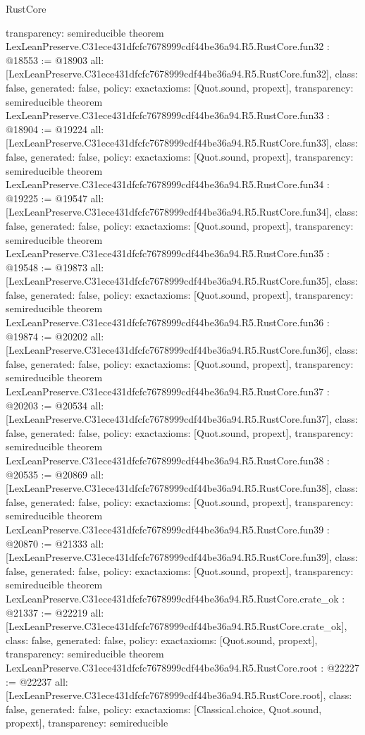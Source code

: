 \begin{lexlean}{RustCore}
\begin{coremodule}
{  transparency: semireducible
}
theorem LexLeanPreserve.C31ece431dfcfc7678999cdf44be36a94.R5.RustCore.fun32 : @18553 := @18903 {
  all: [LexLeanPreserve.C31ece431dfcfc7678999cdf44be36a94.R5.RustCore.fun32],
  class: false,
  generated: false,
  policy: exact{axioms: [Quot.sound, propext]},
  transparency: semireducible
}
theorem LexLeanPreserve.C31ece431dfcfc7678999cdf44be36a94.R5.RustCore.fun33 : @18904 := @19224 {
  all: [LexLeanPreserve.C31ece431dfcfc7678999cdf44be36a94.R5.RustCore.fun33],
  class: false,
  generated: false,
  policy: exact{axioms: [Quot.sound, propext]},
  transparency: semireducible
}
theorem LexLeanPreserve.C31ece431dfcfc7678999cdf44be36a94.R5.RustCore.fun34 : @19225 := @19547 {
  all: [LexLeanPreserve.C31ece431dfcfc7678999cdf44be36a94.R5.RustCore.fun34],
  class: false,
  generated: false,
  policy: exact{axioms: [Quot.sound, propext]},
  transparency: semireducible
}
theorem LexLeanPreserve.C31ece431dfcfc7678999cdf44be36a94.R5.RustCore.fun35 : @19548 := @19873 {
  all: [LexLeanPreserve.C31ece431dfcfc7678999cdf44be36a94.R5.RustCore.fun35],
  class: false,
  generated: false,
  policy: exact{axioms: [Quot.sound, propext]},
  transparency: semireducible
}
theorem LexLeanPreserve.C31ece431dfcfc7678999cdf44be36a94.R5.RustCore.fun36 : @19874 := @20202 {
  all: [LexLeanPreserve.C31ece431dfcfc7678999cdf44be36a94.R5.RustCore.fun36],
  class: false,
  generated: false,
  policy: exact{axioms: [Quot.sound, propext]},
  transparency: semireducible
}
theorem LexLeanPreserve.C31ece431dfcfc7678999cdf44be36a94.R5.RustCore.fun37 : @20203 := @20534 {
  all: [LexLeanPreserve.C31ece431dfcfc7678999cdf44be36a94.R5.RustCore.fun37],
  class: false,
  generated: false,
  policy: exact{axioms: [Quot.sound, propext]},
  transparency: semireducible
}
theorem LexLeanPreserve.C31ece431dfcfc7678999cdf44be36a94.R5.RustCore.fun38 : @20535 := @20869 {
  all: [LexLeanPreserve.C31ece431dfcfc7678999cdf44be36a94.R5.RustCore.fun38],
  class: false,
  generated: false,
  policy: exact{axioms: [Quot.sound, propext]},
  transparency: semireducible
}
theorem LexLeanPreserve.C31ece431dfcfc7678999cdf44be36a94.R5.RustCore.fun39 : @20870 := @21333 {
  all: [LexLeanPreserve.C31ece431dfcfc7678999cdf44be36a94.R5.RustCore.fun39],
  class: false,
  generated: false,
  policy: exact{axioms: [Quot.sound, propext]},
  transparency: semireducible
}
theorem LexLeanPreserve.C31ece431dfcfc7678999cdf44be36a94.R5.RustCore.crate_ok : @21337 := @22219 {
  all: [LexLeanPreserve.C31ece431dfcfc7678999cdf44be36a94.R5.RustCore.crate_ok],
  class: false,
  generated: false,
  policy: exact{axioms: [Quot.sound, propext]},
  transparency: semireducible
}
theorem LexLeanPreserve.C31ece431dfcfc7678999cdf44be36a94.R5.RustCore.root : @22227 := @22237 {
  all: [LexLeanPreserve.C31ece431dfcfc7678999cdf44be36a94.R5.RustCore.root],
  class: false,
  generated: false,
  policy: exact{axioms: [Classical.choice, Quot.sound, propext]},
  transparency: semireducible
}


\end{coremodule}
\end{lexlean}
